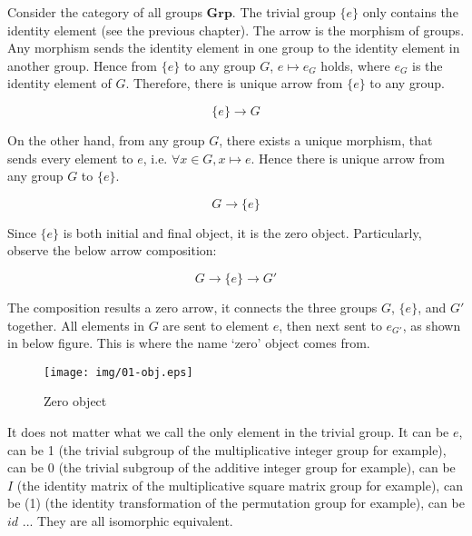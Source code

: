 \documentclass{article}
\begin{document}
\begin{example}
\normalfont
Consider the category of all groups $\pmb{Grp}$. The trivial group $\{e\}$ only contains the identity element (see the previous chapter). The arrow is the morphism of groups. Any morphism sends the identity element in one group to the identity element in another group. Hence from $\{e\}$ to any group $G$, $e \mapsto e_G$ holds, where $e_G$ is the identity element of $G$. Therefore, there is unique arrow from $\{e\}$ to any group.

\[
\{e\} \longrightarrow G
\]

On the other hand, from any group $G$, there exists a unique morphism, that sends every element to $e$, i.e. $\forall x \in G, x \mapsto e$. Hence there is unique arrow from any group $G$ to $\{e\}$.

\[
G \longrightarrow \{e\}
\]

Since $\{e\}$ is both initial and final object, it is the zero object. Particularly, observe the below arrow composition:

\[
  G \longrightarrow \{e\} \longrightarrow G'
\]

The composition results a zero arrow, it connects the three groups $G$, $\{e\}$, and $G'$ together. All elements in $G$ are sent to element $e$, then next sent to $e_{G'}$, as shown in below figure. This is where the name `zero' object comes from.

\begin{figure}[htbp]
 \centering
 \texttt{[image: img/01-obj.eps]}
 \caption{Zero object}
 \label{fig:zero-obj}
\end{figure}

It does not matter what we call the only element in the trivial group. It can be $e$, can be 1 (the trivial subgroup of the multiplicative integer group for example), can be 0 (the trivial subgroup of the additive integer group for example), can be $I$ (the identity matrix of the multiplicative square matrix group for example), can be (1) (the identity transformation of the permutation group for example), can be $id$ ... They are all isomorphic equivalent.
\end{example}
\end{document}
